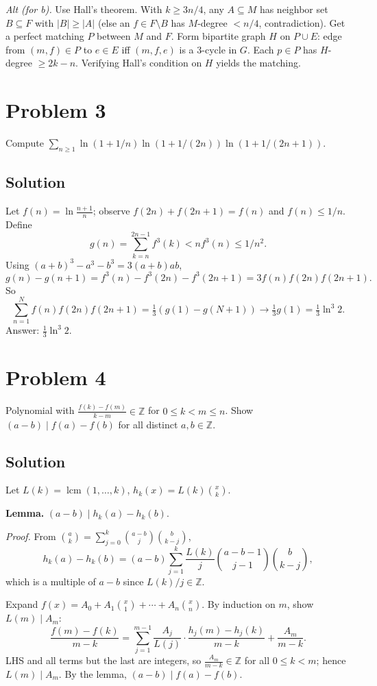 \documentclass{article}
\begin{document}
\emph{Alt (for b).} Use Hall's theorem. With $k \ge 3n/4$, any $A \subseteq M$ has neighbor set $B \subseteq F$ with $|B| \ge |A|$ (else an $f \in F \setminus B$ has $M$-degree $< n/4$, contradiction). Get a perfect matching $P$ between $M$ and $F$. Form bipartite graph $H$ on $P \cup E$: edge from $(m,f) \in P$ to $e \in E$ iff $(m, f, e)$ is a 3-cycle in $G$. Each $p \in P$ has $H$-degree $\ge 2k - n$. Verifying Hall's condition on $H$ yields the matching.

\section*{Problem 3}
Compute $\sum_{n \ge 1} \ln(1 + 1/n) \ln(1 + 1/(2n)) \ln(1 + 1/(2n+1))$.

\subsection*{Solution}
Let $f(n) = \ln\tfrac{n+1}{n}$; observe $f(2n) + f(2n+1) = f(n)$ and $f(n) \le 1/n$. Define
\[
g(n) = \sum_{k=n}^{2n-1} f^3(k) < n f^3(n) \le 1/n^2.
\]
Using $(a+b)^3 - a^3 - b^3 = 3(a+b)ab$,
\[
g(n) - g(n+1) = f^3(n) - f^3(2n) - f^3(2n+1) = 3 f(n) f(2n) f(2n+1).
\]
So
\[
\sum_{n=1}^N f(n) f(2n) f(2n+1) = \tfrac{1}{3}(g(1) - g(N+1)) \to \tfrac{1}{3} g(1) = \tfrac{1}{3} \ln^3 2.
\]
Answer: $\boxed{\tfrac{1}{3} \ln^3 2}$.

\section*{Problem 4}
Polynomial with $\tfrac{f(k) - f(m)}{k - m} \in \mathbb{Z}$ for $0 \le k < m \le n$. Show $(a - b) \mid f(a) - f(b)$ for all distinct $a, b \in \mathbb{Z}$.

\subsection*{Solution}
Let $L(k) = \operatorname{lcm}(1, \ldots, k)$, $h_k(x) = L(k)\binom{x}{k}$.

\textbf{Lemma.} $(a - b) \mid h_k(a) - h_k(b)$.

\emph{Proof.} From $\binom{a}{k} = \sum_{j=0}^k \binom{a-b}{j}\binom{b}{k-j}$,
\[
h_k(a) - h_k(b) = (a - b) \sum_{j=1}^k \frac{L(k)}{j} \binom{a-b-1}{j-1}\binom{b}{k-j},
\]
which is a multiple of $a - b$ since $L(k)/j \in \mathbb{Z}$.

Expand $f(x) = A_0 + A_1\binom{x}{1} + \cdots + A_n\binom{x}{n}$. By induction on $m$, show $L(m) \mid A_m$:
\[
\frac{f(m) - f(k)}{m - k} = \sum_{j=1}^{m-1} \frac{A_j}{L(j)} \cdot \frac{h_j(m) - h_j(k)}{m - k} + \frac{A_m}{m - k}.
\]
LHS and all terms but the last are integers, so $\tfrac{A_m}{m - k} \in \mathbb{Z}$ for all $0 \le k < m$; hence $L(m) \mid A_m$. By the lemma, $(a - b) \mid f(a) - f(b)$.
\end{document}
